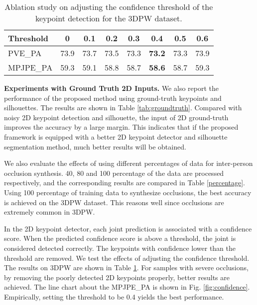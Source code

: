 \documentclass[journal]{IEEEtran}
\begin{document}

\begin{table}[!htbp]
\caption{Ablation study on adjusting the confidence threshold of the keypoint detection for the 3DPW dataset.}
\begin{center}
\begin{tabular}{lccccccc}
\hline
Threshold & 0    & 0.1  & 0.2  & 0.3  & 0.4  & 0.5  & 0.6  \\ \hline
PVE\_PA   & 73.9 & 73.7 & 73.5 & 73.3 & \textbf{73.2} & 73.3 & 73.9 \\ \hline
MPJPE\_PA & 59.3 & 59.1 & 58.8 & 58.7 & \textbf{58.6} & 58.7 & 59.3 \\ \hline
\end{tabular}
\label{confidence}
\end{center}
\end{table}
\vspace{-0.2cm}

\noindent\textbf{Experiments with Ground Truth 2D Inputs.}  We also report the performance of the proposed method using ground-truth keypoints and silhouettes. The results are shown in Table \ref{tab:groundtruth}. Compared with noisy 2D keypoint detection and silhouette,  the input of 2D ground-truth improves the accuracy by a large margin. This indicates that if the proposed framework is equipped with a better 2D keypoint detector and silhouette segmentation method, much better results will be obtained.

We also evaluate the effects of using different percentages of data for inter-person occlusion synthesis. 40, 80 and 100 percentage of the data are processed respectively, and the corresponding results are compared in Table \ref{percentage}. Using 100 percentage of training data to synthesize occlusions, the best accuracy is achieved on the 3DPW dataset. This reasons well since occlusions are extremely common in 3DPW.

In the 2D keypoint detector, each joint prediction is associated with a confidence score. When the predicted confidence score is above a threshold, the joint is considered detected correctly. The keypoints with confidence lower than the threshold are removed. We test the effects of adjusting the confidence threshold.  The results on 3DPW are shown in Table \ref{confidence}.  For samples with severe occlusions, by removing the poorly detected 2D keypoints properly, better results are achieved. The line chart about the MPJPE\_PA is shown in Fig. \ref{fig:confidence}. Empirically, setting the threshold to be 0.4 yields the best performance.
\end{document}
